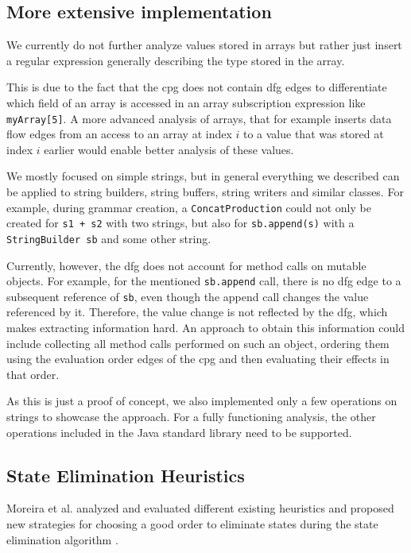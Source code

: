 \subsection{More extensive implementation}

We currently do not further analyze values stored in arrays but rather just insert a regular expression generally describing the type stored in the array.

This is due to the fact that the \ac{cpg} does not contain \ac{dfg} edges to differentiate which field of an array is accessed in an array subscription expression like \lstinline|myArray[5]|.
A more advanced analysis of arrays, that for example inserts data flow edges from an access to an array at index $i$ to a value that was stored at index $i$ earlier would enable better analysis of these values.

We mostly focused on simple strings, but in general everything we described can be applied to string builders, string buffers, string writers and similar classes. For example, during grammar creation, a \lstinline|ConcatProduction| could not only be created for \lstinline|s1 + s2| with two strings, but also for \lstinline|sb.append(s)| with a \lstinline|StringBuilder sb| and some other string. 

Currently, however, the \ac{dfg} does not account for method calls on mutable objects. For example, for the mentioned \lstinline|sb.append| call, there is no \ac{dfg} edge to a subsequent reference of \lstinline|sb|, even though the append call changes the value referenced by it. Therefore, the value change is not reflected by the \ac{dfg}, which makes extracting information hard. An approach to obtain this information could include collecting all method calls performed on such an object, ordering them using the evaluation order edges of the \ac{cpg} and then evaluating their effects in that order.

As this is just a proof of concept, we also implemented only a few operations on strings to showcase the approach. For a fully functioning analysis, the other operations included in the Java standard library need to be supported.

\subsection{State Elimination Heuristics}

Moreira et al. analyzed and evaluated different existing heuristics and proposed new strategies for choosing a good order to eliminate states during the state elimination algorithm \cite{moreira_heuristics}.

